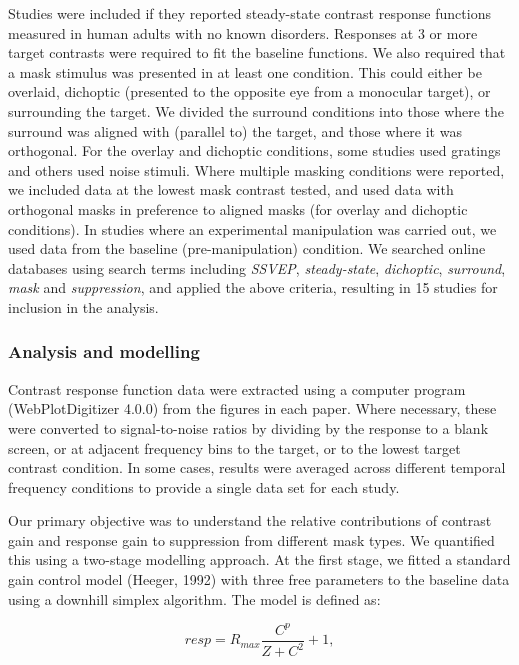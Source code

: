 \documentclass[]{article}
\begin{document}
Studies were included if they reported steady-state contrast response functions measured in human adults with no known disorders. Responses at 3 or more target contrasts were required to fit the baseline functions. We also required that a mask stimulus was presented in at least one condition. This could either be overlaid, dichoptic (presented to the opposite eye from a monocular target), or surrounding the target. We divided the surround conditions into those where the surround was aligned with (parallel to) the target, and those where it was orthogonal. For the overlay and dichoptic conditions, some studies used gratings and others used noise stimuli. Where multiple masking conditions were reported, we included data at the lowest mask contrast tested, and used data with orthogonal masks in preference to aligned masks (for overlay and dichoptic conditions). In studies where an experimental manipulation was carried out, we used data from the baseline (pre-manipulation) condition. We searched online databases using search terms including \emph{SSVEP}, \emph{steady-state}, \emph{dichoptic}, \emph{surround}, \emph{mask} and \emph{suppression}, and applied the above criteria, resulting in 15 studies for inclusion in the analysis.

\hypertarget{analysis-and-modelling}{%
\subsubsection{Analysis and modelling}\label{analysis-and-modelling}}

Contrast response function data were extracted using a computer program (WebPlotDigitizer 4.0.0) from the figures in each paper. Where necessary, these were converted to signal-to-noise ratios by dividing by the response to a blank screen, or at adjacent frequency bins to the target, or to the lowest target contrast condition. In some cases, results were averaged across different temporal frequency conditions to provide a single data set for each study.

Our primary objective was to understand the relative contributions of contrast gain and response gain to suppression from different mask types. We quantified this using a two-stage modelling approach. At the first stage, we fitted a standard gain control model (Heeger, 1992) with three free parameters to the baseline data using a downhill simplex algorithm. The model is defined as:

\begin{equation}
\label{eq:GC1}
resp = R_{max}\frac{C^p}{Z + C^2} + 1,
\end{equation}
\end{document}
